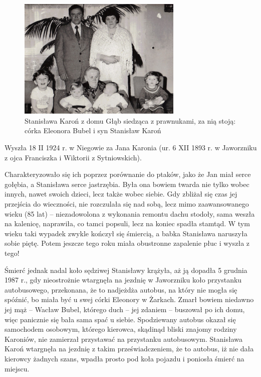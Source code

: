 \begin{figure}[!h]
\begin{center}
\includegraphics[width=0.7\textwidth]{zdjecia/statnislawa_karon_1.jpg}
\caption[Stanisława Karoń z rodziną]{Stanisława Karoń z domu Głąb siedząca z prawnukami, za nią stoją: córka Eleonora Bubel i syn Stanisław Karoń}
\label{rys:statnislawa_karon_1}
\end{center}
\end{figure}

Wyszła 18 II 1924 r. w Niegowie za Jana Karonia (ur. 6 XII 1893 r. w Jaworzniku z ojca Franciszka i Wiktorii z Sytniowskich).

Charakteryzowało się ich poprzez porównanie do ptaków, jako że Jan miał serce gołębia, a Stanisława serce jastrzębia. Była ona bowiem twarda nie tylko wobec innych, nawet swoich dzieci, lecz także wobec siebie. Gdy zbliżał się czas jej przejścia do wieczności, nie rozczulała się nad sobą, lecz mimo zaawansowanego wieku (85 lat) -- niezadowolona z wykonania remontu dachu stodoły, sama weszła na kalenicę, naprawiła, co tamci popsuli, lecz na koniec spadła stamtąd. W tym wieku taki wypadek zwykle kończył się śmiercią, a babka Stanisława naruszyła sobie piętę. Potem jeszcze tego roku miała obustronne zapalenie płuc i wyszła z tego!

Śmierć jednak nadal koło sędziwej Stanisławy krążyła, aż ją dopadła 5 grudnia 1987 r., gdy nieostrożnie wtargnęła na jezdnię w Jaworzniku koło przystanku autobusowego, przekonana, że to nadjeżdża autobus, na który nie mogła się spóźnić, bo miała być u swej córki Eleonory w Żarkach. Zmarł bowiem niedawno jej mąż -- Wacław Bubel, którego duch -- jej zdaniem -- buszował po ich domu, więc panicznie się bała sama spać u siebie. Spodziewany autobus okazał się samochodem osobowym, którego kierowca, skądinąd  bliski znajomy rodziny Karoniów, nie zamierzał przystawać na przystanku autobusowym. Stanisława Karoń wtargnęła na jezdnię z takim przeświadczeniem, że to autobus, iż nie dała kierowcy żadnych szans, wpadła prosto pod koła pojazdu i poniosła śmierć na miejscu.


